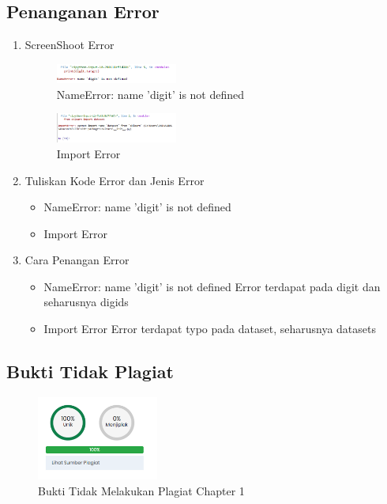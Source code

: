 \subsection{Penanganan Error}
\begin{enumerate}
	\item ScreenShoot Error
	\begin{figure}[H]
		\includegraphics[width=4cm]{figures/1174005/tugas1/error/3.PNG}
		\centering
		\caption{NameError: name 'digit' is not defined}
	\end{figure}
	\begin{figure}[H]
		\includegraphics[width=4cm]{figures/1174005/tugas1/error/4.PNG}
		\centering
		\caption{Import Error}
	\end{figure}
	\item Tuliskan Kode Error dan Jenis Error
	\begin{itemize}
		\item NameError: name 'digit' is not defined
		\item Import Error
	\end{itemize}
	\item Cara Penangan Error
	\begin{itemize}
		\item NameError: name 'digit' is not defined
		\hfill\break
		Error terdapat pada digit dan seharusnya digids
		\item Import Error
		\hfill\break
		Error terdapat typo pada dataset, seharusnya datasets
	\end{itemize}
\end{enumerate}
\subsection{Bukti Tidak Plagiat}
\begin{figure}[H]
	\includegraphics[width=4cm]{figures/1174005/tugas1/plagiat/5.PNG}
	\centering
	\caption{Bukti Tidak Melakukan Plagiat Chapter 1}
\end{figure}